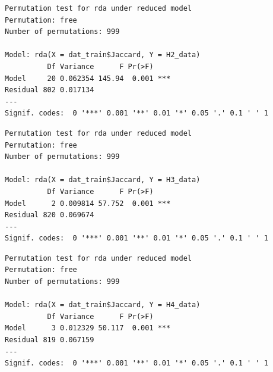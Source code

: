 \documentclass[
  letterpaper,
  DIV=11,
  numbers=noendperiod]{scrreprt}
\newenvironment{Shaded}{\begin{snugshade}}{\end{snugshade}}
\newcommand{\CommentTok}[1]{\textcolor[rgb]{0.37,0.37,0.37}{#1}}
\newcommand{\FunctionTok}[1]{\textcolor[rgb]{0.28,0.35,0.67}{#1}}
\newcommand{\NormalTok}[1]{\textcolor[rgb]{0.00,0.23,0.31}{#1}}
\newcommand{\SpecialCharTok}[1]{\textcolor[rgb]{0.37,0.37,0.37}{#1}}
\begin{document}
\begin{Shaded}
\end{Shaded}

\begin{verbatim}
Permutation test for rda under reduced model
Permutation: free
Number of permutations: 999

Model: rda(X = dat_train$Jaccard, Y = H2_data)
          Df Variance      F Pr(>F)    
Model     20 0.062354 145.94  0.001 ***
Residual 802 0.017134                  
---
Signif. codes:  0 '***' 0.001 '**' 0.01 '*' 0.05 '.' 0.1 ' ' 1
\end{verbatim}

\begin{Shaded}
\end{Shaded}

\begin{verbatim}
Permutation test for rda under reduced model
Permutation: free
Number of permutations: 999

Model: rda(X = dat_train$Jaccard, Y = H3_data)
          Df Variance      F Pr(>F)    
Model      2 0.009814 57.752  0.001 ***
Residual 820 0.069674                  
---
Signif. codes:  0 '***' 0.001 '**' 0.01 '*' 0.05 '.' 0.1 ' ' 1
\end{verbatim}

\begin{Shaded}
\end{Shaded}

\begin{verbatim}
Permutation test for rda under reduced model
Permutation: free
Number of permutations: 999

Model: rda(X = dat_train$Jaccard, Y = H4_data)
          Df Variance      F Pr(>F)    
Model      3 0.012329 50.117  0.001 ***
Residual 819 0.067159                  
---
Signif. codes:  0 '***' 0.001 '**' 0.01 '*' 0.05 '.' 0.1 ' ' 1
\end{verbatim}
\end{document}
